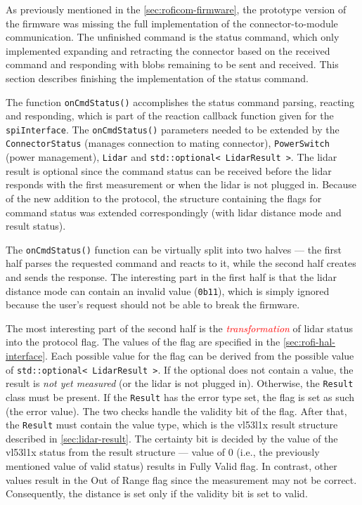 \documentclass[
  digital,     %
  oneside,     %
  nosansbold,  %
  nocolorbold, %
  nolof,         %
  nolot,         %
]{fithesis4}
\newcommand{\TODO}[1]{\textcolor{red}{\textit{#1}}}
\begin{document}
{{{As previously mentioned in the \autoref{sec:roficom-firmware}, the prototype version of the firmware was missing the full implementation of the connector-to-module communication. The unfinished command is the status command, which only implemented expanding and retracting the connector based on the received command and responding with blobs remaining to be sent and received. This section describes finishing the implementation of the status command.

The function \lstinline|onCmdStatus()| accomplishes the status command parsing, reacting and responding, which is part of the reaction callback function given for the \lstinline|spiInterface|. The \lstinline|onCmdStatus()| parameters needed to be extended by the \lstinline|ConnectorStatus| (manages connection to mating connector), \lstinline|PowerSwitch| (power management), \lstinline|Lidar| and \lstinline|std::optional< LidarResult >|. The \acrshort{lidar} result is optional since the command status can be received before the \acrshort{lidar} responds with the first measurement or when the \acrshort{lidar} is not plugged in. Because of the new addition to the protocol, the structure containing the flags for command status was extended correspondingly (with \acrshort{lidar} distance mode and result status).

The \lstinline|onCmdStatus()| function can be virtually split into two halves --- the first half parses the requested command and reacts to it, while the second half creates and sends the response. The interesting part in the first half is that the \acrshort{lidar} distance mode can contain an invalid value (\lstinline|0b11|), which is simply ignored because the user's request should not be able to break the firmware.

The most interesting part of the second half is the \TODO{transformation} of \acrshort{lidar} status into the protocol flag. The values of the flag are specified in the \autoref{sec:rofi-hal-interface}. Each possible value for the flag can be derived from the possible value of \lstinline|std::optional< LidarResult >|. If the optional does not contain a value,  the result is \emph{not yet measured} (or the \acrshort{lidar} is not plugged in). Otherwise, the \lstinline|Result| class must be present. If the \lstinline|Result| has the error type set, the flag is set as such (the error value). The two checks handle the validity bit of the flag. After that, the \lstinline|Result| must contain the value type, which is the \gls{vl53l1x} result structure described in \autoref{sec:lidar-result}. The certainty bit is decided by the value of the \gls{vl53l1x} status from the result structure --- value of $0$ (i.e., the previously mentioned value of valid status) results in Fully Valid flag. In contrast, other values result in the Out of Range flag since the measurement may not be correct. Consequently, the distance is set only if the validity bit is set to valid.

}}}
\end{document}

